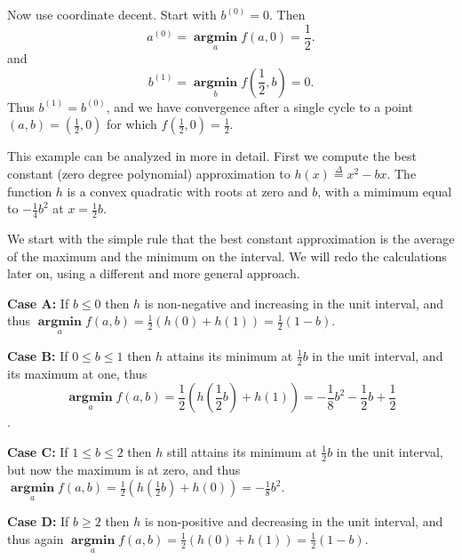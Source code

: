 \documentclass[
  12pt,
]{book}
\begin{document}
Now use coordinate decent. Start with \(b^{(0)}=0.\) Then
\[
a^{(0)}=\mathop{\mathbf{argmin}}\limits_{a} f(a,0)=\frac12.
\]
and
\[
b^{(1)}=\mathop{\mathbf{argmin}}\limits_{b}f(\frac12,b)=0.
\]
Thus \(b^{(1)}=b^{(0)}\), and
we have convergence after a single cycle to a point \((a,b)=(\frac12,0)\) for
which \(f(\frac12,0)=\frac12\).

This example can be analyzed in more in detail. First we compute the best constant (zero degree polynomial) approximation
to \(h(x)\mathop{=}\limits^{\Delta}x^2-bx\). The function \(h\) is a convex quadratic with roots at zero and \(b\), with a mimimum equal to \(-\frac14 b^2\) at \(x=\frac12 b\).

We start with the simple rule that the best constant approximation is the average of the maximum and the minimum on the interval. We will redo the calculations later on, using a different and more general approach.

\textbf{Case A:} If \(b\leq 0\) then \(h\) is non-negative and increasing in the unit interval, and thus \(\mathop{\mathbf{argmin}}\limits_{a} f(a,b)=\frac12(h(0)+h(1))=\frac12(1-b)\).

\textbf{Case B:} If \(0\leq b\leq 1\) then \(h\) attains its minimum at \(\frac12 b\) in the unit interval, and its maximum at one, thus \[\mathop{\mathbf{argmin}}\limits_{a} f(a,b)=\frac12(h(\frac12 b)+h(1))=-\frac18 b^2-\frac12 b +\frac12\].

\textbf{Case C:} If \(1\leq b\leq 2\) then \(h\) still attains its minimum at \(\frac12 b\) in the unit interval, but now the maximum is at zero, and thus \(\mathop{\mathbf{argmin}}\limits_{a} f(a,b)=\frac12(h(\frac12 b)+h(0))=-\frac18 b^2\).

\textbf{Case D:} If \(b\geq 2\) then \(h\) is non-positive and decreasing in the unit interval, and thus again \(\mathop{\mathbf{argmin}}\limits_{a} f(a,b)=\frac12(h(0)+h(1))=\frac12(1-b)\).
\end{document}
